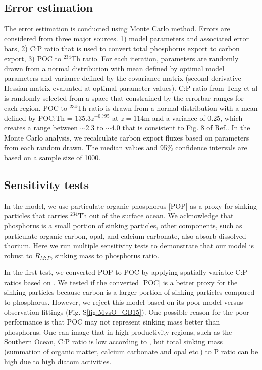 \subsection{Error estimation}
The error estimation is conducted using Monte Carlo method. Errors are considered from three major sources.
1) model parameters and associated error bars, 2) C:P ratio that is used to convert total phosphorus export to carbon export, 3) POC to $^{234}$Th ratio.
For each iteration, parameters are randomly drawn from a normal distribution with mean defined by optimal model parameters and variance defined by the covariance matrix (second derivative Hessian matrix evaluated at optimal parameter values).
C:P ratio from Teng et al is randomly selected from a space that constrained by the errorbar ranges for each region.
POC to $^{234}$Th ratio is drawn from a normal distribution with a mean defined by POC:Th = $135.3z^{-0.795}$ at $z = 114 $m and a variance of 0.25, which creates a range between $\sim$2.3 to $\sim$4.0 that is consistent to Fig. 8 of Ref.\citep{Owens2015}.
In the Monte Carlo analysis, we recalculate carbon export fluxes based on parameters from each random drawn.
The median values and 95\% confidence intervals are based{} on a sample size of 1000.

\subsection{Sensitivity tests}
In the model, we use particulate organic phosphorus [POP] as a proxy for sinking particles that carries $^{234}$Th out of the surface ocean.
We acknowledge that phosphorus is a small portion of sinking particles, other components, such as particulate organic carbon, opal, and calcium carbonate, also absorb dissolved thorium.
Here we run multiple sensitivity tests to demonstrate that our model is robust to $R_{M:P}$, sinking mass to phosphorus ratio.

In the first test, we converted POP to POC by applying spatially variable C:P ratios based on \cite{Galbraith2015}.
We tested if the converted [POC] is a better proxy for the sinking particles because carbon is a larger portion of sinking particles compared to phosphorus.
However, we reject this model based on its poor model versus observation fittings (Fig. S\ref{fig:MvsO_GB15}).
One possible reason for the poor performance is that POC may not represent sinking mass better than phosphorus.
One can image that in high productivity regions, such as the Southern Ocean, C:P ratio is low according to \cite{Galbraith2015}, but total sinking mass (summation of organic matter, calcium carbonate and opal etc.) to P ratio can be high due to high diatom activities.

